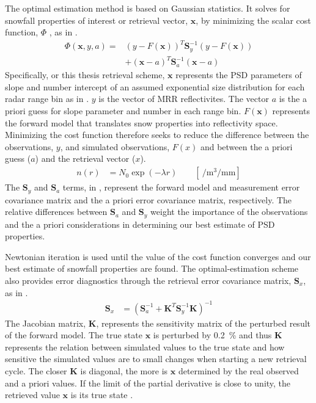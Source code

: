 \par\medskip\noindent
The optimal estimation method is based on Gaussian statistics.  It solves for snowfall properties of interest or retrieval vector, $\mathbf{x}$, by minimizing the scalar cost function, $\Phi$ , as in .
\begin{equation}
\begin{split}
\Phi(\mathbf{x},y,a) = & (y- F(\mathbf{x}))^T \mathbf{S}_y^{-1} 			(y-F(\mathbf{x})) \\
&+(\mathbf{x}-a)^T \mathbf{S}_{a}^{-1} (\mathbf{x}-a)
\end{split} \label{eq:scalar_cost_fct}
\end{equation}
Specifically, or this thesis retrieval scheme, $\mathbf{x}$ represents the PSD parameters of slope and number intercept of an assumed exponential size distribution for each radar range bin as in . $y$ is the vector of MRR reflectivites. The vector $a$ is the a priori guess for slope parameter and number in each range bin. $F(\mathbf{x})$ represents the forward model that translates snow properties into reflectivity space.  Minimizing the cost function therefore seeks to reduce the difference between the observations, $y$, and simulated observations, $F(x)$ and between the a priori guess ($a$) and the retrieval vector ($x$).
\begin{align}
	n(r) & = N_{0} \exp\left(-\lambda r\right) \qquad [ \SI{}{\per\cubic\metre\per\mm} ] \label{eq:num_dens}
\end{align}
The $\mathbf{S}_y$ and $\mathbf{S}_{a}$ terms, in , represent the forward model and measurement error covariance matrix and the a priori error covariance matrix, respectively. The relative differences between $\mathbf{S}_{a}$ and $\mathbf{S}_y$ weight the importance of the observations and the a priori considerations in determining our best estimate of PSD properties. 
\par\medskip\noindent
Newtonian iteration is used until the value of the cost function converges and our best estimate of snowfall properties are found.  The optimal-estimation scheme also provides error diagnostics through the retrieval error covariance matrix, $\mathbf{S}_x$, as in .
\begin{align}
	\mathbf{S}_x & = \left( \mathbf{S}_a^{-1} + \mathbf{K}^T \mathbf{S}_y^{-1} \mathbf{K} \right)^{-1}\label{eq:Sx}
\end{align}
The Jacobian matrix, $\mathbf{K}$, represents the sensitivity matrix of the perturbed result of the forward model. The true state $\mathbf{x}$ is perturbed by \SI{0.2}{\percent} and thus $\mathbf{K}$ represents the relation between simulated values to the true state and how sensitive the simulated values are to small changes when starting a new retrieval cycle. The closer $\mathbf{K}$ is diagonal, the more is $\mathbf{x}$ determined by the real observed and a priori values. If the limit of the partial derivative is close to unity, the retrieved value $\mathbf{x}$ is its true state \citep{wood_estimation_2011}.
